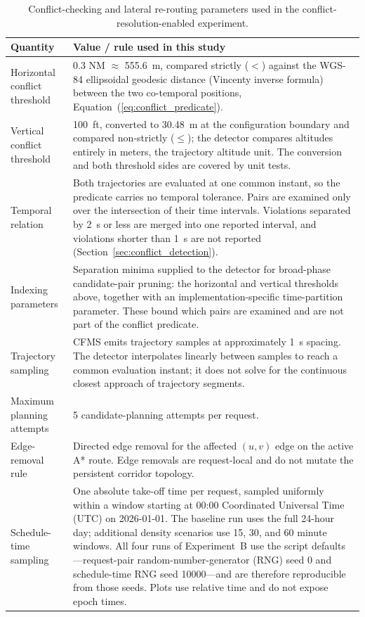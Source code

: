 \begin{table}[H]
    \centering
    \caption{Conflict-checking and lateral re-routing parameters used in the conflict-resolution-enabled experiment.}
    \label{tab:deconfliction_params}
    \small
    \begin{tabularx}{\textwidth}{lX}
        \toprule
        Quantity & Value / rule used in this study \\
        \midrule
        Horizontal conflict threshold & 0.3 NM \(\approx\) \SI{555.6}{m}, compared strictly (\(<\)) against the WGS-84 ellipsoidal geodesic distance (Vincenty inverse formula) between the two co-temporal positions, Equation~(\ref{eq:conflict_predicate}). \\
        Vertical conflict threshold & 100~ft, converted to \SI{30.48}{m} at the configuration boundary and compared non-strictly (\(\le\)); the detector compares altitudes entirely in meters, the trajectory altitude unit. The conversion and both threshold sides are covered by unit tests. \\
        Temporal relation & Both trajectories are evaluated at one common instant, so the predicate carries no temporal tolerance. Pairs are examined only over the intersection of their time intervals. Violations separated by \SI{2}{s} or less are merged into one reported interval, and violations shorter than \SI{1}{s} are not reported (Section~\ref{sec:conflict_detection}). \\
        Indexing parameters & Separation minima supplied to the detector for broad-phase candidate-pair pruning: the horizontal and vertical thresholds above, together with an implementation-specific time-partition parameter. These bound which pairs are examined and are not part of the conflict predicate. \\
        Trajectory sampling & CFMS emits trajectory samples at approximately \SI{1}{s} spacing. The detector interpolates linearly between samples to reach a common evaluation instant; it does not solve for the continuous closest approach of trajectory segments. \\
        Maximum planning attempts & 5 candidate-planning attempts per request. \\
        Edge-removal rule & Directed edge removal for the affected \((u,v)\) edge on the active A* route. Edge removals are request-local and do not mutate the persistent corridor topology. \\
        Schedule-time sampling & One absolute take-off time per request, sampled uniformly within a window starting at 00:00 Coordinated Universal Time (UTC) on 2026-01-01. The baseline run uses the full 24-hour day; additional density scenarios use 15, 30, and 60 minute windows. All four runs of Experiment~B use the script defaults---request-pair random-number-generator (RNG) seed 0 and schedule-time RNG seed 10000---and are therefore reproducible from those seeds. Plots use relative time and do not expose epoch times. \\

\end{tabularx}
\end{table}
